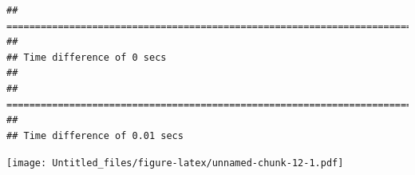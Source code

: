 \documentclass[
]{article}
\begin{document}
\begin{verbatim}
## ================================================================================
## 
## Time difference of 0 secs
## 
## ================================================================================
## 
## Time difference of 0.01 secs
\end{verbatim}

\texttt{[image: Untitled\_files/figure-latex/unnamed-chunk-12-1.pdf]}
\end{document}
